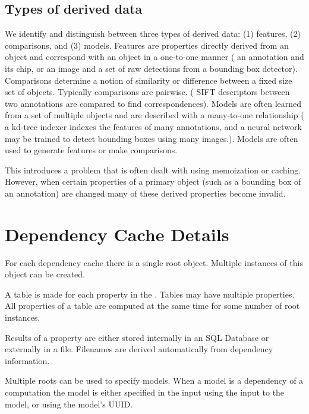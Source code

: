     \subsection{Types of derived data}
        We identify and distinguish between three types of derived
          data:
        (1) features,
        (2) comparisons, and
        (3) models.
        Features are properties directly derived from an object and
          correspond with an object in a one-to-one manner (\eg{} an
          annotation and its chip, or an image and a set of raw
          detections from a bounding box detector).
        Comparisons determine a notion of similarity or difference
          between a fixed size set of objects.
        Typically comparisons are pairwise.
        (\eg{} SIFT descriptors between two annotations are compared
          to find correspondences).
        Models are often learned from a set of multiple objects and
          are described with a many-to-one relationship (\eg{} a kd-tree
          indexer indexes the features of many annotations, and a neural
          network may be trained to detect bounding boxes using many
          images.).
        Models are often used to generate features or make
          comparisons.

        This introduces a problem that is often dealt with using
          memoization or caching.
        However, when certain properties of a primary object (such as
          a bounding box of an annotation) are changed many of these
          derived properties become invalid.

\section{Dependency Cache Details}\label{sec:depcdetails}

For each dependency cache there is a single root object.
Multiple instances of this object can be created.

A table is made for each property in the \depcache{}.
Tables may have multiple properties.
All properties of a table are computed at the same time for some
  number of root instances.

Results of a property are either stored internally in an SQL Database
  or externally in a file.
Filenames are derived automatically from dependency information.

Multiple roots can be used to specify models.
When a model is a dependency of a computation the model is either
  specified in the input using the input to the model, or using the
  model's UUID{}.


